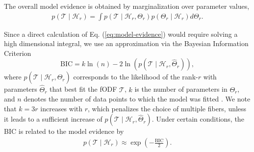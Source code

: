 The overall model evidence is obtained by marginalization over parameter values,
\begin{align}
	p \left( \mathcal{T} \mid \mathcal{H}_r \right) = \int p \left(
		\mathcal{T} \mid \mathcal{H}_r , \Theta_r 
	\right) p \left( \Theta_r \mid \mathcal{H}_r  \right) d \Theta_r. 
	\label{eq:model-evidence}
\end{align}

Since a direct calculation of Eq. (\ref{eq:model-evidence}) would require solving a
high dimensional integral, we use an approximation via the Bayesian Information
Criterion
\[ \text{BIC} = k \ln \left( n \right) - 2 \ln \left( p \left( \mathcal{T} \mid
\mathcal{H}_r, \hat{\Theta}_r \right) \right), \]
where $p \left(  \mathcal{T} \mid \mathcal{H}_r , \hat{\Theta}_r \right)$
corresponds to the likelihood of the rank-$r$ with parameters $\hat{\Theta}_r$
that best fit the fODF $\mathcal{T}$, $k$ is the number of parameters in
$\Theta_r$, and $n$ denotes the number of data points to which the model was
fitted \cite{Schwarz1978}. We note that $k=3r$ increases with $r$, which penalizes the choice of multiple fibers, unless it leads to a sufficient increase of $p \left(  \mathcal{T} \mid \mathcal{H}_r , \hat{\Theta}_r \right)$. Under certain conditions, the BIC is related to the
model evidence by \cite{Konishi2008}
\begin{align}
	p \left( \mathcal{T} \mid \mathcal{H}_r \right) \approx \exp \left(  -
		\frac{\text{BIC}}{2}
\right).
	\label{eq:BIC-model}
\end{align}

